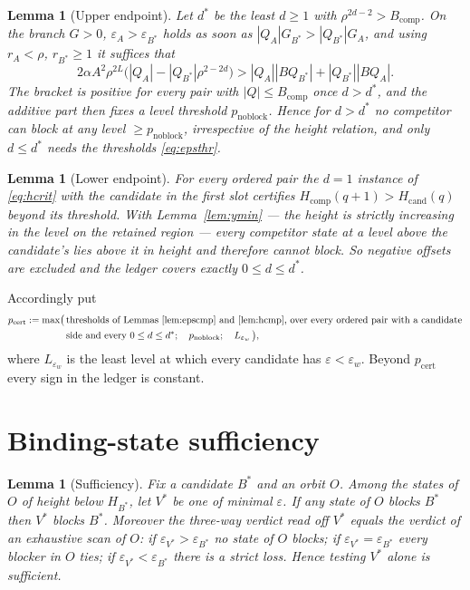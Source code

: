 \documentclass[11pt]{article}
\newtheorem{lemma}[theorem]{Lemma}
\theoremstyle{definition}
\theoremstyle{remark}
\newcommand{\epsw}{\varepsilon_w}
\begin{document}
\begin{lemma}[Upper endpoint]\label{lem:dstar}
Let $d^{*}$ be the least $d\ge1$ with $\rho^{2d-2}>B_{\mathrm{comp}}$. On the branch $G>0$,
$\varepsilon_A>\varepsilon_{B^{*}}$ holds as soon as $|Q_A|G_{B^{*}}>|Q_{B^{*}}|G_A$, and using
$r_A<\rho$, $r_{B^{*}}\ge1$ it suffices that
\begin{equation}\label{eq:noblock}
2\alpha A^2\rho^{2L}\bigl(|Q_A|-|Q_{B^{*}}|\rho^{2-2d}\bigr)
>|Q_A||BQ_{B^{*}}|+|Q_{B^{*}}||BQ_A| .
\end{equation}
The bracket is positive for every pair with $|Q|\le B_{\mathrm{comp}}$ once $d>d^{*}$, and the
additive part then fixes a level threshold $p_{\mathrm{noblock}}$. Hence for $d>d^{*}$ no
competitor can block at any level $\ge p_{\mathrm{noblock}}$, irrespective of the height
relation, and only $d\le d^{*}$ needs the thresholds \eqref{eq:epsthr}.
\end{lemma}

\begin{lemma}[Lower endpoint]\label{lem:lower}
For every ordered pair the $d=1$ instance of \eqref{eq:hcrit} with the \emph{candidate} in the
first slot certifies $H_{\text{comp}}(q+1)>H_{\text{cand}}(q)$ beyond its threshold. With
Lemma~\ref{lem:ymin} --- the height is strictly increasing in the level on the retained region
--- every competitor state at a level above the candidate's lies above it in height and
therefore cannot block. So negative offsets are excluded and the ledger covers exactly
$0\le d\le d^{*}$.
\end{lemma}

Accordingly put
\begin{align*}
p_{\mathrm{cert}}:=\max\bigl(\,&\text{thresholds of Lemmas~\ref{lem:epscmp} and
  \ref{lem:hcmp}, over every ordered pair with a candidate}\\
&\text{side and every }0\le d\le d^{*};\quad
p_{\mathrm{noblock}};\quad L_{\epsw}\,\bigr),
\end{align*}
where $L_{\epsw}$ is the least level at which every candidate has $\varepsilon<\epsw$. Beyond
$p_{\mathrm{cert}}$ every sign in the ledger is constant.

\section{Binding-state sufficiency}\label{sec:binding}

\begin{lemma}[Sufficiency]\label{lem:binding}
Fix a candidate $B^{*}$ and an orbit $O$. Among the states of $O$ of height below $H_{B^{*}}$,
let $V^{*}$ be one of minimal $\varepsilon$. If \emph{any} state of $O$ blocks $B^{*}$ then
$V^{*}$ blocks $B^{*}$. Moreover the three-way verdict read off $V^{*}$ equals the verdict of an
exhaustive scan of $O$: if $\varepsilon_{V^{*}}>\varepsilon_{B^{*}}$ no state of $O$ blocks; if
$\varepsilon_{V^{*}}=\varepsilon_{B^{*}}$ every blocker in $O$ ties; if
$\varepsilon_{V^{*}}<\varepsilon_{B^{*}}$ there is a strict loss. Hence testing $V^{*}$ alone is
sufficient.
\end{lemma}
\end{document}
